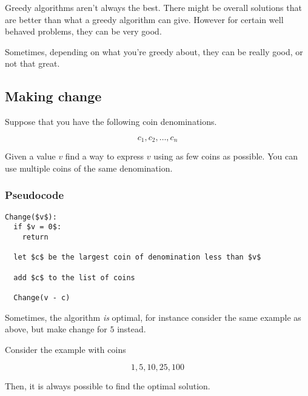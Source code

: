 \documentclass[12pt]{article}
\begin{document}
  Greedy algorithms aren't always the best. There might be overall solutions that
  are better than what a greedy algorithm can give. However for certain well
  behaved problems, they can be very good.

  Sometimes, depending on what you're greedy about, they can be really good, or
  not that great.

  \subsection{Making change}

  Suppose that you have the following coin denominations.

  \[
    c_1, c_2, \dots, c_n
  \]

  Given a value $v$ find a way to express $v$ using as few coins as possible. You
  can use multiple coins of the same denomination.

  \subsubsection{Pseudocode}

  \begin{lstlisting}
Change($v$):
  if $v = 0$:
    return

  let $c$ be the largest coin of denomination less than $v$

  add $c$ to the list of coins

  Change(v - c)
  \end{lstlisting}



  Sometimes, the algorithm {\it is} optimal, for instance consider the same
  example as above, but make change for $5$ instead.


  Consider the example with coins

  \[
    1, 5, 10, 25, 100
  \]

  Then, it is always possible to find the optimal solution.

\end{document}
